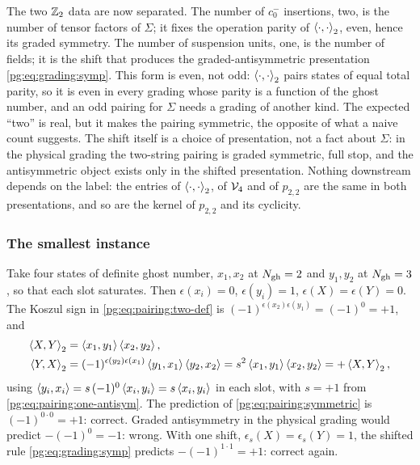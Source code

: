The two $\mathbb{Z}_2$ data are now separated.
The number of $c_0^-$ insertions, two, is the number of tensor factors of $\Sigma$; it fixes the operation parity of $\braket{\cdot,\cdot}_2$, even, hence its graded symmetry.
The number of suspension units, one, is the number of fields; it is the shift that produces the graded-antisymmetric presentation \eqref{pg:eq:grading:symp}.
This form is even, not odd: $\braket{\cdot,\cdot}_2$ pairs states of equal total parity, so it is even in every grading whose parity is a function of the ghost number, and an odd pairing for $\Sigma$ needs a grading of another kind.
The expected \enquote{two} is real, but it makes the pairing symmetric, the opposite of what a naive count suggests.
The shift itself is a choice of presentation, not a fact about $\Sigma$: in the physical grading the two-string pairing is graded symmetric, full stop, and the antisymmetric object exists only in the shifted presentation.
Nothing downstream depends on the label: the entries of $\braket{\cdot,\cdot}_2$, of ${\mathcal{V}}_4$ and of $p_{2,2}$ are the same in both presentations, and so are the kernel of $p_{2,2}$ and its cyclicity.

\subsubsection{The smallest instance}
\label{pg:sec:grading:example}

Take four states of definite ghost number, $x_1,x_2$ at $N_{\rm gh}=2$ and $y_1,y_2$ at $N_{\rm gh}=3$, so that each slot saturates.
Then $\epsilon(x_i)=0$, $\epsilon(y_i)=1$, $\epsilon(X)=\epsilon(Y)=0$.
The Koszul sign in \eqref{pg:eq:pairing:two-def} is $(-1)^{\epsilon(x_2)\epsilon(y_1)}=(-1)^{0}=+1$, and
\begin{align}
  \braket{X, Y}_2
    &
    = \braket{x_1, y_1} \braket{x_2, y_2},
  \\
  \braket{Y, X}_2
    &
    = (-1)^{\epsilon(y_2)\epsilon(x_1)} \braket{y_1, x_1} \braket{y_2, x_2}
    = s^2 \braket{x_1, y_1} \braket{x_2, y_2}
    = + \braket{X, Y}_2,
\end{align}
using $\braket{y_i,x_i}=s\,(-1)^{0}\braket{x_i,y_i}=s\braket{x_i,y_i}$ in each slot, with $s = +1$ from \eqref{pg:eq:pairing:one-antisym}.
The prediction of \eqref{pg:eq:pairing:symmetric} is $(-1)^{0\cdot0}=+1$: correct.
Graded antisymmetry in the physical grading would predict $-(-1)^{0}=-1$: wrong.
With one shift, $\epsilon_s(X)=\epsilon_s(Y)=1$, the shifted rule \eqref{pg:eq:grading:symp} predicts $-(-1)^{1\cdot1}=+1$: correct again.

